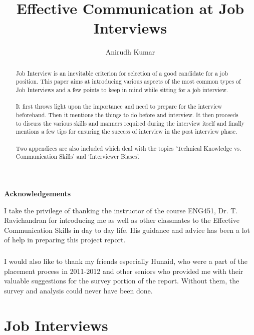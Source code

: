 \documentclass[a4paper,12pt]{report}
\title{Effective Communication at Job Interviews}
\author{Anirudh Kumar}
\makeatletter
\newcommand\ackname{Acknowledgements}
\newenvironment{acknowledgements}{%
      \titlepage
      \null\vfil
      \@beginparpenalty\@lowpenalty
      \begin{center}%
        \bfseries \ackname
        \@endparpenalty\@M
      \end{center}}%
     {\par\vfil\null\endtitlepage}
\newenvironment{acknowledgements}{%
      \if@twocolumn
        \section*{\abstractname}%
      \else
        \small
        \begin{center}%
          {\bfseries \ackname\vspace{-.5em}\vspace{\z@}}%
        \end{center}%
        \quotation
      \fi}
      {\if@twocolumn\else\endquotation\fi}
\makeatother
\begin{document}
\maketitle

\begin{abstract}
Job Interview is an inevitable criterion for selection of a good candidate for a job position. This paper aims at introducing various aspects
of the most common types of Job Interviews and a few points to keep in mind while sitting for a job interview.
\paragraph{}
It first throws light upon the importance and need to prepare for the interview beforehand. Then it mentions the
things to do before and interview. It then proceeds to discuss the various skills and manners required during the interview itself 
and finally mentions a few tips for ensuring the success of interview in the post interview phase.
\paragraph{}
Two appendices are also included which deal with the topics `Technical Knowledge vs. Communication Skills'
and `Interviewer Biases'.
\end{abstract}

\begin{acknowledgements}
I take the privilege of thanking the instructor of the course ENG451, Dr. T. Ravichandran
for introducing me as well as other classmates to the Effective Communication Skills
 in day to day life. His guidance and advice has been a lot of help in preparing this project report.
\paragraph{}
I would also like to thank my friends especially Hunaid, who were a part of the placement process in
2011-2012 and other seniors who provided me with their valuable suggestions for
the survey portion of the report. Without them, the survey and analysis could never have
been done.
\end{acknowledgements}

\tableofcontents
{}

\chapter{Job Interviews}             %
\end{document}

